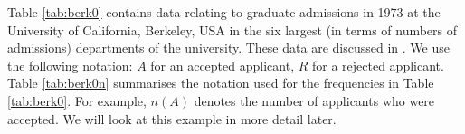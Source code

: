 \documentclass[
  british,
  11pt,
  openany, a4paper]{book}
\begin{document}
Table \ref{tab:berk0} contains data relating to graduate admissions in 1973 at the University of California, Berkeley, USA in the six largest (in terms of numbers of admissions) departments of the university. These data are discussed in \citet{berkeley}. We use the following notation: \(A\) for an accepted applicant, \(R\) for a rejected applicant. Table \ref{tab:berk0n} summarises the notation used for the frequencies in Table \ref{tab:berk0}. For example, \(n(A)\) denotes the number of applicants who were accepted. We will look at this example in more detail later.

 
  \providecommand{\huxb}[2]{\arrayrulecolor[RGB]{#1}\global\arrayrulewidth=#2pt}
  \providecommand{\huxvb}[2]{\color[RGB]{#1}\vrule width #2pt}
  \providecommand{\huxtpad}[1]{\rule{0pt}{#1}}
  \providecommand{\huxbpad}[1]{\rule[-#1]{0pt}{#1}}
\end{document}
